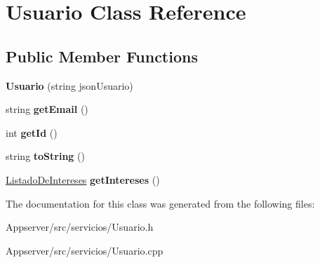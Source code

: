 \hypertarget{classUsuario}{}\section{Usuario Class Reference}
\label{classUsuario}
\subsection*{Public Member Functions}
\begin{DoxyCompactItemize}
\item 
{\bfseries Usuario} (string json\+Usuario)\hypertarget{classUsuario_ac9ffa1cc291fdeaf0d9f334a24dfa1e0}{}\label{classUsuario_ac9ffa1cc291fdeaf0d9f334a24dfa1e0}

\item 
string {\bfseries get\+Email} ()\hypertarget{classUsuario_a3acda6589935fbba258896baddd98fb8}{}\label{classUsuario_a3acda6589935fbba258896baddd98fb8}

\item 
int {\bfseries get\+Id} ()\hypertarget{classUsuario_af72cadb2cfa815ef3318f2544d1df4ef}{}\label{classUsuario_af72cadb2cfa815ef3318f2544d1df4ef}

\item 
string {\bfseries to\+String} ()\hypertarget{classUsuario_a5f2234908325bc89b0849c0ab28d61aa}{}\label{classUsuario_a5f2234908325bc89b0849c0ab28d61aa}

\item 
\hyperlink{classListadoDeIntereses}{Listado\+De\+Intereses} {\bfseries get\+Intereses} ()\hypertarget{classUsuario_ac4a42ec1b452a32367ae2a5f0273b223}{}\label{classUsuario_ac4a42ec1b452a32367ae2a5f0273b223}

\end{DoxyCompactItemize}


The documentation for this class was generated from the following files\+:\begin{DoxyCompactItemize}
\item 
Appserver/src/servicios/Usuario.\+h\item 
Appserver/src/servicios/Usuario.\+cpp\end{DoxyCompactItemize}
